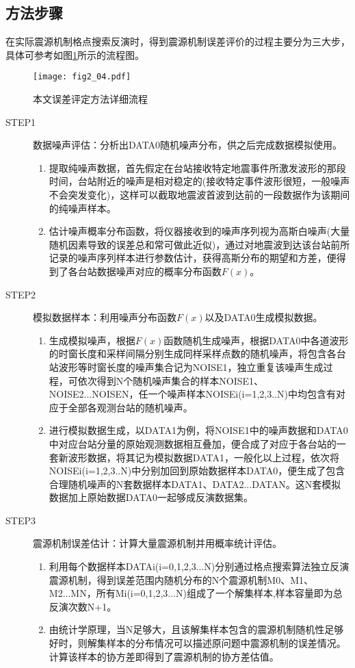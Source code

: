 \subsection{方法步骤}
在实际震源机制格点搜索反演时，得到震源机制误差评价的过程主要分为三大步，具体可参考如图\ref{fig2_04}所示的流程图。
\begin{figure}
\centering
  \texttt{[image: fig2\_04.pdf]} 
  \caption{本文误差评定方法详细流程}
  \label{fig2_04}
\end{figure}

\begin{description}
\item[STEP1]数据噪声评估：分析出DATA0随机噪声分布，供之后完成数据模拟使用。
\begin{enumerate}
\item 提取纯噪声数据，首先假定在台站接收特定地震事件所激发波形的那段时间，台站附近的噪声是相对稳定的(接收特定事件波形很短，一般噪声不会突发变化)，这样可以截取地震波首波到达前的一段数据作为该期间的纯噪声样本。
\item 估计噪声概率分布函数，将仪器接收到的噪声序列视为高斯白噪声(大量随机因素导致的误差总和常可做此近似)，通过对地震波到达该台站前所记录的噪声序列样本进行参数估计，获得高斯分布的期望和方差，便得到了各台站数据噪声对应的概率分布函数$F(x)$。
\end{enumerate}

\item[STEP2]模拟数据样本：利用噪声分布函数$F(x)$以及DATA0生成模拟数据。
\begin{enumerate}
\item 生成模拟噪声，根据$F(x)$函数随机生成噪声，根据DATA0中各道波形的时窗长度和采样间隔分别生成同样采样点数的随机噪声，将包含各台站波形等时窗长度的噪声集合记为NOISE1，独立重复该噪声生成过程，可依次得到N个随机噪声集合的样本NOISE1、NOISE2...NOISEN，任一个噪声样本NOISEi(i=1,2,3..N)中均包含有对应于全部各观测台站的随机噪声。
\item 进行模拟数据生成，以DATA1为例，将NOISE1中的噪声数据和DATA0中对应台站分量的原始观测数据相互叠加，便合成了对应于各台站的一套新波形数据，将其记为模拟数据DATA1，一般化以上过程，依次将NOISEi(i=1,2,3..N)中分别加回到原始数据样本DATA0，便生成了包含合理随机噪声的N套数据样本DATA1、DATA2...DATAN。这N套模拟数据加上原始数据DATA0一起够成反演数据集。
\end{enumerate}

\item[STEP3]震源机制误差估计：计算大量震源机制并用概率统计评估。
\begin{enumerate}
\item 利用每个数据样本DATAi(i=0,1,2,3...N)分别通过格点搜索算法独立反演震源机制，得到误差范围内随机分布的N个震源机制M0、M1、M2...MN，所有Mi(i=0,1,2,3...N)组成了一个解集样本,样本容量即为总反演次数N+1。
\item 由统计学原理，当N足够大，且该解集样本包含的震源机制随机性足够好时，则解集样本的分布情况可以描述原问题中震源机制的误差情况。计算该样本的协方差即得到了震源机制的协方差估值。
\end{enumerate}

\end{description}
